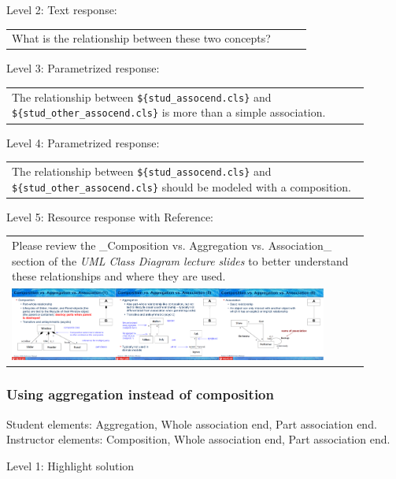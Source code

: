 \noindent Level 2: Text response: \medskip

\begin{tabular}{|p{0.9\linewidth}}
What is the relationship between these two concepts?
\end{tabular} \medskip

\noindent Level 3: Parametrized response: \medskip

\begin{tabular}{|p{0.9\linewidth}}
The relationship between \verb|${stud_assocend.cls}| and \verb|${stud_other_assocend.cls}| is more than a simple association.
\end{tabular} \medskip

\noindent Level 4: Parametrized response: \medskip

\begin{tabular}{|p{0.9\linewidth}}
The relationship between \verb|${stud_assocend.cls}| and \verb|${stud_other_assocend.cls}| should be modeled with a composition.
\end{tabular} \medskip

\noindent Level 5: Resource response with Reference: \medskip

\begin{tabular}{|p{0.9\linewidth}}
Please review the _Composition vs. Aggregation vs. Association_ section of 
the \textit{UML Class Diagram lecture slides} to 
better understand these relationships and where they are used.

\\
\includegraphics[width=0.9\textwidth]{images/composition_aggregation_association.png}
\end{tabular} \medskip


\subsubsection{Using aggregation instead of composition}

Student elements: Aggregation, Whole association end, Part association end. Instructor elements: Composition, Whole association end, Part association end. \medskip

\noindent Level 1: Highlight solution  \medskip

